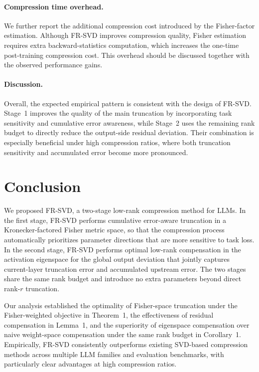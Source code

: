 \documentclass[a4paper,fleqn]{cas-dc}
\begin{document}
\paragraph{Compression time overhead.}
We further report the additional compression cost introduced by the Fisher-factor estimation. Although FR-SVD improves compression quality, Fisher estimation requires extra backward-statistics computation, which increases the one-time post-training compression cost. This overhead should be discussed together with the observed performance gains.

\paragraph{Discussion.}
Overall, the expected empirical pattern is consistent with the design of FR-SVD. Stage~1 improves the quality of the main truncation by incorporating task sensitivity and cumulative error awareness, while Stage~2 uses the remaining rank budget to directly reduce the output-side residual deviation. Their combination is especially beneficial under high compression ratios, where both truncation sensitivity and accumulated error become more pronounced.

\section{Conclusion}

We proposed FR-SVD, a two-stage low-rank compression method for LLMs. In the first stage, FR-SVD performs cumulative error-aware truncation in a Kronecker-factored Fisher metric space, so that the compression process automatically prioritizes parameter directions that are more sensitive to task loss. In the second stage, FR-SVD performs optimal low-rank compensation in the activation eigenspace for the global output deviation that jointly captures current-layer truncation error and accumulated upstream error. The two stages share the same rank budget and introduce no extra parameters beyond direct rank-$r$ truncation.

Our analysis established the optimality of Fisher-space truncation under the Fisher-weighted objective in Theorem~1, the effectiveness of residual compensation in Lemma~1, and the superiority of eigenspace compensation over naive weight-space compensation under the same rank budget in Corollary~1. Empirically, FR-SVD consistently outperforms existing SVD-based compression methods across multiple LLM families and evaluation benchmarks, with particularly clear advantages at high compression ratios.
\end{document}
